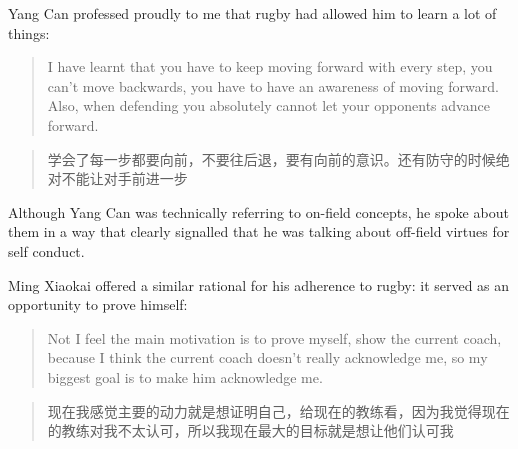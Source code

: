 \begin{CJK}{UTF8}{gbsn}
Yang Can professed proudly to me that rugby had allowed him to learn a lot of things:

\begin{quotation}
    I have learnt that you have to keep moving forward with every step, you can’t move backwards, you have to have an awareness of moving forward.  Also, when defending you absolutely cannot let your opponents advance forward.
\end{quotation}

\begin{quotation}
    学会了每一步都要向前，不要往后退，要有向前的意识。还有防守的时候绝对不能让对手前进一步
\end{quotation}

Although Yang Can was technically referring to on-field concepts, he spoke about them in a way that clearly signalled that he was talking about off-field virtues for self conduct.

Ming Xiaokai offered a similar rational for his adherence to rugby: it served as an opportunity to prove himself:

  \begin{quotation}
    Not I feel the main motivation is to prove myself, show the current coach, because I think the current coach doesn't really acknowledge me, so my biggest goal is to make him acknowledge me.
  \end{quotation}

  \begin{quotation}
    现在我感觉主要的动力就是想证明自己，给现在的教练看，因为我觉得现在的教练对我不太认可，所以我现在最大的目标就是想让他们认可我
  \end{quotation}



\end{CJK}
